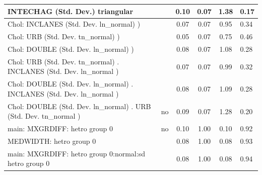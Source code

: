 \begin{table}
\begin{center}
\begin{tabular}{|l|l|c|c|c|l|}
			\hline
			INTECHAG (Std. Dev.) triangular &  & 0.10 & 0.07 & 1.38 & 0.17 \\
			\hline
			 Chol: INCLANES (Std. Dev. ln_normal) ) &  & 0.07 & 0.07 & 0.95 & 0.34 \\
			\hline
			 Chol: URB (Std. Dev. tn_normal) ) &  & 0.05 & 0.07 & 0.75 & 0.46 \\
			\hline
			 Chol: DOUBLE (Std. Dev. ln_normal) ) &  & 0.08 & 0.07 & 1.08 & 0.28 \\
			\hline
			 Chol: URB (Std. Dev. tn_normal) . INCLANES (Std. Dev.   ln_normal ) &  & 0.07 & 0.07 & 0.99 & 0.32 \\
			\hline
			 Chol: DOUBLE (Std. Dev. ln_normal) . INCLANES (Std. Dev.   ln_normal ) &  & 0.08 & 0.07 & 1.09 & 0.28 \\
			\hline
			 Chol: DOUBLE (Std. Dev. ln_normal) . URB (Std. Dev.   tn_normal ) & no & 0.09 & 0.07 & 1.28 & 0.20 \\
			\hline
			main: MXGRDIFF: hetro group 0 & no & 0.10 & 1.00 & 0.10 & 0.92 \\
			\hline
			MEDWIDTH: hetro group 0 &  & 0.08 & 1.00 & 0.08 & 0.93 \\
			\hline
			main: MXGRDIFF: hetro group 0:normal:sd  hetro group 0 &  & 0.08 & 1.00 & 0.08 & 0.94 \\
			\hline
		\end{tabular}
	\end{center}
\end{table}